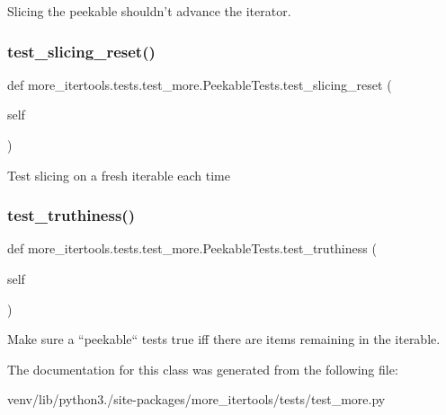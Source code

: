 \begin{DoxyVerb}Slicing the peekable shouldn't advance the iterator.\end{DoxyVerb}
 \mbox{\label{classmore__itertools_1_1tests_1_1test__more_1_1_peekable_tests_a151a68e1de3426f956dda3f9cb05de1f}} 
\subsubsection{\texorpdfstring{test\+\_\+slicing\+\_\+reset()}{test\_slicing\_reset()}}
{\footnotesize\ttfamily def more\+\_\+itertools.\+tests.\+test\+\_\+more.\+Peekable\+Tests.\+test\+\_\+slicing\+\_\+reset (\begin{DoxyParamCaption}\item[{}]{self }\end{DoxyParamCaption})}

\begin{DoxyVerb}Test slicing on a fresh iterable each time\end{DoxyVerb}
 \mbox{\label{classmore__itertools_1_1tests_1_1test__more_1_1_peekable_tests_a2409487b1fa8b1068c91a02505d68838}} 
\subsubsection{\texorpdfstring{test\+\_\+truthiness()}{test\_truthiness()}}
{\footnotesize\ttfamily def more\+\_\+itertools.\+tests.\+test\+\_\+more.\+Peekable\+Tests.\+test\+\_\+truthiness (\begin{DoxyParamCaption}\item[{}]{self }\end{DoxyParamCaption})}

\begin{DoxyVerb}Make sure a ``peekable`` tests true iff there are items remaining in
the iterable.\end{DoxyVerb}
 

The documentation for this class was generated from the following file\+:\begin{DoxyCompactItemize}
\item 
venv/lib/python3./site-\/packages/more\+\_\+itertools/tests/test\+\_\+more.\+py\end{DoxyCompactItemize}
